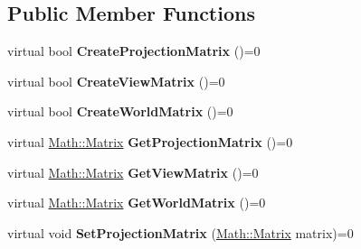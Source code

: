 \subsection*{Public Member Functions}
\begin{DoxyCompactItemize}
\item 
\hypertarget{struct_jade_1_1_graphics_1_1_i_constant_buffer_a431d36b403634475b18ff34d8160f417}{}virtual bool {\bfseries Create\+Projection\+Matrix} ()=0\label{struct_jade_1_1_graphics_1_1_i_constant_buffer_a431d36b403634475b18ff34d8160f417}

\item 
\hypertarget{struct_jade_1_1_graphics_1_1_i_constant_buffer_af2097d8df9756fe2dbcfa5e73a7b623d}{}virtual bool {\bfseries Create\+View\+Matrix} ()=0\label{struct_jade_1_1_graphics_1_1_i_constant_buffer_af2097d8df9756fe2dbcfa5e73a7b623d}

\item 
\hypertarget{struct_jade_1_1_graphics_1_1_i_constant_buffer_adb6345c5c452cae4bc17e53e04babb81}{}virtual bool {\bfseries Create\+World\+Matrix} ()=0\label{struct_jade_1_1_graphics_1_1_i_constant_buffer_adb6345c5c452cae4bc17e53e04babb81}

\item 
\hypertarget{struct_jade_1_1_graphics_1_1_i_constant_buffer_aa7eaa1c2225706c56ffe845aac858021}{}virtual \hyperlink{struct_jade_1_1_math_1_1_matrix}{Math\+::\+Matrix} {\bfseries Get\+Projection\+Matrix} ()=0\label{struct_jade_1_1_graphics_1_1_i_constant_buffer_aa7eaa1c2225706c56ffe845aac858021}

\item 
\hypertarget{struct_jade_1_1_graphics_1_1_i_constant_buffer_a916256650c5abc057f6718573a16e24c}{}virtual \hyperlink{struct_jade_1_1_math_1_1_matrix}{Math\+::\+Matrix} {\bfseries Get\+View\+Matrix} ()=0\label{struct_jade_1_1_graphics_1_1_i_constant_buffer_a916256650c5abc057f6718573a16e24c}

\item 
\hypertarget{struct_jade_1_1_graphics_1_1_i_constant_buffer_af1b121fd9ced9db28491a9260de012ce}{}virtual \hyperlink{struct_jade_1_1_math_1_1_matrix}{Math\+::\+Matrix} {\bfseries Get\+World\+Matrix} ()=0\label{struct_jade_1_1_graphics_1_1_i_constant_buffer_af1b121fd9ced9db28491a9260de012ce}

\item 
\hypertarget{struct_jade_1_1_graphics_1_1_i_constant_buffer_afd72c1014e5cc1f90d76b4cdf0233a6a}{}virtual void {\bfseries Set\+Projection\+Matrix} (\hyperlink{struct_jade_1_1_math_1_1_matrix}{Math\+::\+Matrix} matrix)=0\label{struct_jade_1_1_graphics_1_1_i_constant_buffer_afd72c1014e5cc1f90d76b4cdf0233a6a}


\end{DoxyCompactItemize}
